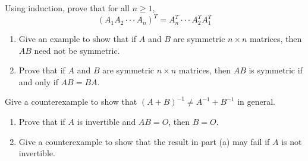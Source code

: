 \documentclass[12pt,letterpaper]{hmcpset}
\begin{document}

\begin{problem}[3.2.33]
Using induction, prove that for all $n \geq 1$, $$(A_1A_2 \cdot \cdot \cdot A_n)^T  = A_n^T \cdot \cdot \cdot A_2^TA_1^T$$
\end{problem}

\begin{solution}
\vfill
\end{solution}
\newpage

\begin{problem}[3.2.36]
\begin{enumerate}
	\item
		Give an example to show that if $A$ and $B$ are symmetric $n\times n$ matrices, then $AB$ need not be symmetric.
	\item
		Prove that if $A$ and $B$ are symmetric $n\times n$ matrices, then $AB$ is symmetric if and only if $AB = BA$.
\end{enumerate}

\end{problem}

\begin{solution}
\vfill
\end{solution}
\newpage

\begin{problem}[3.3.19]
Give a counterexample to show that $(A + B)^{-1} \neq A^{-1} + B^{-1}$ in general.

\end{problem}

\begin{solution}
\vfill
\end{solution}
\newpage

\begin{problem}[3.3.42]
\begin{enumerate}
	\item
		Prove that if $A$ is invertible and $AB = O$, then $B = O$.
	\item
		Give a counterexample to show that the result in part (a) may fail if $A$ is not invertible.
\end{enumerate}

\end{problem}

\begin{solution}
\vfill
\end{solution}

\newpage
\end{document}
